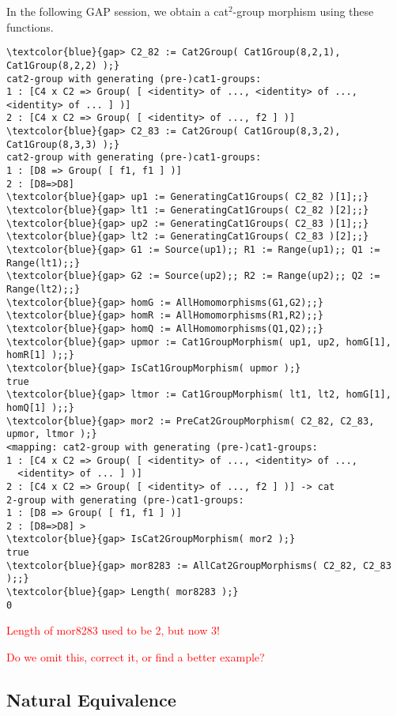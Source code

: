 \documentclass[a4paper,11pt]{article}
\theoremstyle{plain}
\theoremstyle{definition}
\begin{document}
In the following \textsf{GAP} session, we obtain a cat$^{2}$-group morphism
using these functions.

\begin{Verbatim}[frame=single, fontsize=\small, commandchars=\\\{\}]
\textcolor{blue}{gap> C2_82 := Cat2Group( Cat1Group(8,2,1), Cat1Group(8,2,2) );}
cat2-group with generating (pre-)cat1-groups:
1 : [C4 x C2 => Group( [ <identity> of ..., <identity> of ...,
<identity> of ... ] )]
2 : [C4 x C2 => Group( [ <identity> of ..., f2 ] )]
\textcolor{blue}{gap> C2_83 := Cat2Group( Cat1Group(8,3,2), Cat1Group(8,3,3) );}
cat2-group with generating (pre-)cat1-groups:
1 : [D8 => Group( [ f1, f1 ] )]
2 : [D8=>D8]
\textcolor{blue}{gap> up1 := GeneratingCat1Groups( C2_82 )[1];;}
\textcolor{blue}{gap> lt1 := GeneratingCat1Groups( C2_82 )[2];;}
\textcolor{blue}{gap> up2 := GeneratingCat1Groups( C2_83 )[1];;}
\textcolor{blue}{gap> lt2 := GeneratingCat1Groups( C2_83 )[2];;}
\textcolor{blue}{gap> G1 := Source(up1);; R1 := Range(up1);; Q1 := Range(lt1);;}
\textcolor{blue}{gap> G2 := Source(up2);; R2 := Range(up2);; Q2 := Range(lt2);;}
\textcolor{blue}{gap> homG := AllHomomorphisms(G1,G2);;}
\textcolor{blue}{gap> homR := AllHomomorphisms(R1,R2);;}
\textcolor{blue}{gap> homQ := AllHomomorphisms(Q1,Q2);;}
\textcolor{blue}{gap> upmor := Cat1GroupMorphism( up1, up2, homG[1], homR[1] );;}
\textcolor{blue}{gap> IsCat1GroupMorphism( upmor );}
true
\textcolor{blue}{gap> ltmor := Cat1GroupMorphism( lt1, lt2, homG[1], homQ[1] );;}
\textcolor{blue}{gap> mor2 := PreCat2GroupMorphism( C2_82, C2_83, upmor, ltmor );}
<mapping: cat2-group with generating (pre-)cat1-groups:
1 : [C4 x C2 => Group( [ <identity> of ..., <identity> of ..., 
  <identity> of ... ] )]
2 : [C4 x C2 => Group( [ <identity> of ..., f2 ] )] -> cat
2-group with generating (pre-)cat1-groups:
1 : [D8 => Group( [ f1, f1 ] )]
2 : [D8=>D8] >
\textcolor{blue}{gap> IsCat2GroupMorphism( mor2 );}
true
\textcolor{blue}{gap> mor8283 := AllCat2GroupMorphisms( C2_82, C2_83 );;}
\textcolor{blue}{gap> Length( mor8283 );}
0
\end{Verbatim}

\textcolor{red}{Length of mor8283 used to be 2, but now 3!} 

\textcolor{red}{Do we omit this, correct it, or find a better example?} 

\subsection{Natural Equivalence}
\end{document}
